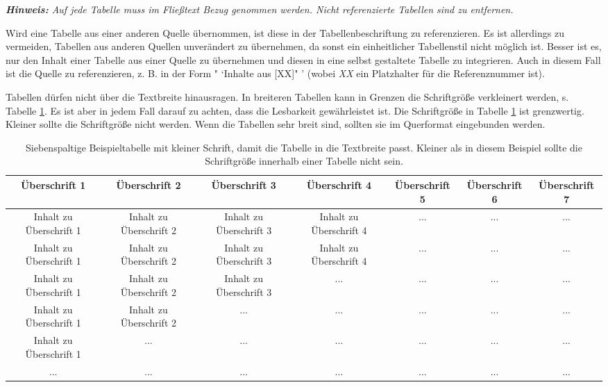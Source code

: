 \begin{addmargin}[1cm]{1cm}
	\textit{\textbf{Hinweis:} Auf jede Tabelle muss im Fließtext Bezug genommen werden. Nicht referenzierte Tabellen sind zu entfernen.}
\end{addmargin}

Wird eine Tabelle aus einer anderen Quelle übernommen, ist diese in der Tabellenbeschriftung zu referenzieren. Es ist allerdings zu vermeiden, Tabellen aus anderen Quellen unverändert zu übernehmen, da sonst ein einheitlicher Tabellenstil nicht möglich ist. Besser ist es, nur den Inhalt einer Tabelle aus einer Quelle zu übernehmen und diesen in eine selbst gestaltete Tabelle zu integrieren. Auch in diesem Fall ist die Quelle zu referenzieren, z. B. in der Form " `Inhalte aus [XX]" ' (wobei \textit{XX} ein Platzhalter für die Referenznummer ist).

Tabellen dürfen nicht über die Textbreite hinausragen. In breiteren Tabellen kann in Grenzen die Schriftgröße verkleinert werden, s. Tabelle \ref{tab:Beispieltab-2_DE}. Es ist aber in jedem Fall darauf zu achten, dass die Lesbarkeit gewährleistet ist. Die Schriftgröße in Tabelle \ref{tab:Beispieltab-2_DE} ist grenzwertig. Kleiner sollte die Schriftgröße nicht werden. Wenn die Tabellen sehr breit sind, sollten sie im Querformat eingebunden werden.

\begin{table}[t]%
	\tiny
	\centering
	\caption[Siebenspaltige Beispieltabelle mit kleiner Schrift.]{Siebenspaltige Beispieltabelle mit kleiner Schrift, damit die Tabelle in die Textbreite passt. Kleiner als in diesem Beispiel sollte die Schriftgröße innerhalb einer Tabelle nicht sein.}
	\begin{tabular}{ccccccc}
		\toprule
		\textbf{Überschrift 1} & \textbf{Überschrift 2} & \textbf{Überschrift 3} & \textbf{Überschrift 4} & \textbf{Überschrift 5} & \textbf{Überschrift 6} & \textbf{Überschrift 7} \\
		\midrule
		Inhalt zu Überschrift 1 & Inhalt zu Überschrift 2 & Inhalt zu Überschrift 3 & Inhalt zu Überschrift 4 & ... & ... & ... \\
		Inhalt zu Überschrift 1 & Inhalt zu Überschrift 2 & Inhalt zu Überschrift 3 & Inhalt zu Überschrift 4 & ... & ... & ... \\
		Inhalt zu Überschrift 1 & Inhalt zu Überschrift 2 & Inhalt zu Überschrift 3 & ... & ... & ... & ... \\
		Inhalt zu Überschrift 1 & Inhalt zu Überschrift 2 & ... & ... & ... & ... & ... \\
		Inhalt zu Überschrift 1 & ... & ... & ... & ... & ... & ... \\
		... & ... & ... & ... & ... & ... & ... \\
		\bottomrule
	\end{tabular}%
	\label{tab:Beispieltab-2_DE}%
\end{table}%

